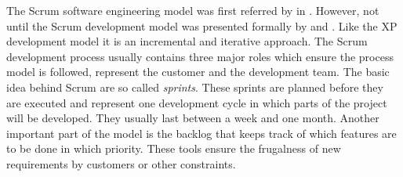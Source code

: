 The Scrum software engineering model was first referred by
\textcite{DeGrace1990} in \citeyear{DeGrace1990}. However, not until
\citeyear{Sutherland1995} the Scrum development model was presented formally by
\textcite{Sutherland1995} and \textcite{Schwaber1995}. Like the \acl{XP}
development model it is an incremental and iterative approach. The Scrum
development process usually contains three major roles which ensure the process
model is followed, represent the customer and the development team. The basic
idea behind Scrum are so called \emph{sprints}. These sprints are planned
before they are executed and represent one development cycle in which parts of
the project will be developed. They usually last between a week and one month.
Another important part of the model is the backlog that keeps track of which
features are to be done in which priority. These tools ensure the frugalness of
new requirements by customers or other constraints.




